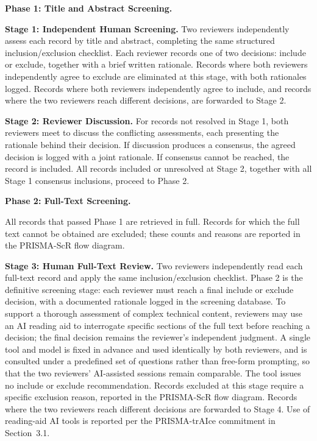 \documentclass[review,12pt]{elsarticle}
\begin{document}
\textbf{Phase 1: Title and Abstract Screening.}

\textbf{Stage 1: Independent Human Screening.} Two reviewers independently assess each record by title and abstract, completing the same structured inclusion/exclusion checklist. Each reviewer records one of two decisions: include or exclude, together with a brief written rationale. Records where both reviewers independently agree to exclude are eliminated at this stage, with both rationales logged. Records where both reviewers independently agree to include, and records where the two reviewers reach different decisions, are forwarded to Stage 2.

\textbf{Stage 2: Reviewer Discussion.} For records not resolved in Stage 1, both reviewers meet to discuss the conflicting assessments, each presenting the rationale behind their decision. If discussion produces a consensus, the agreed decision is logged with a joint rationale. If consensus cannot be reached, the record is included. All records included or unresolved at Stage 2, together with all Stage 1 consensus inclusions, proceed to Phase 2.

\textbf{Phase 2: Full-Text Screening.}

All records that passed Phase 1 are retrieved in full. Records for which the full text cannot be obtained are excluded; these counts and reasons are reported in the PRISMA-ScR flow diagram.

\textbf{Stage 3: Human Full-Text Review.} Two reviewers independently read each full-text record and apply the same inclusion/exclusion checklist. Phase 2 is the definitive screening stage: each reviewer must reach a final include or exclude decision, with a documented rationale logged in the screening database. To support a thorough assessment of complex technical content, reviewers may use an AI reading aid to interrogate specific sections of the full text before reaching a decision; the final decision remains the reviewer's independent judgment.  A single tool and model is fixed in advance and used identically by both reviewers, and is consulted under a predefined set of questions rather than free-form prompting, so that the two reviewers' AI-assisted sessions remain comparable. The tool issues no include or exclude recommendation. Records excluded at this stage require a specific exclusion reason, reported in the PRISMA-ScR flow diagram. Records where the two reviewers reach different decisions are forwarded to Stage 4.  Use of reading-aid AI tools is reported per the PRISMA-trAIce commitment in Section~3.1.
\end{document}

